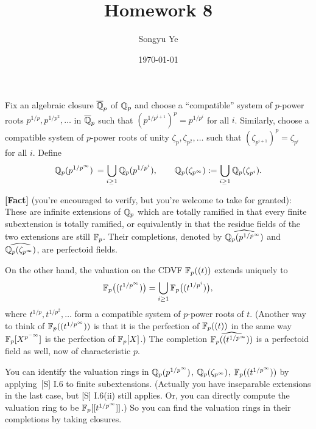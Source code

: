 \documentclass[12pt]{article}  %
\title{Homework 8}
\author{Songyu Ye}
\date{\today}
\begin{document}
\psettitle


Fix an algebraic closure $\overline{\mathbb{Q}}_p$ of $\mathbb{Q}_p$ and choose a ``compatible''
system of $p$-power roots $p^{1/p},p^{1/p^2},\ldots$ in $\overline{\mathbb{Q}}_p$
such that $(p^{1/p^{i+1}})^p=p^{1/p^i}$ for all $i$.
Similarly, choose a compatible system of $p$-power roots of unity
$\zeta_p,\zeta_{p^2},\ldots$ such that $(\zeta_{p^{i+1}})^p=\zeta_{p^i}$ for all $i$.
Define
\[
  \mathbb{Q}_p(p^{1/p^\infty})\:= \bigcup_{i\ge1}\mathbb{Q}_p(p^{1/p^i}),
  \qquad
  \mathbb{Q}_p(\zeta_{p^\infty}):= \bigcup_{i\ge1}\mathbb{Q}_p(\zeta_{p^i}).
\]

\noindent\textbf{[Fact]} (you’re encouraged to verify, but you’re welcome to take for granted):
These are infinite extensions of $\mathbb{Q}_p$ which are totally ramified
in that every finite subextension is totally ramified, or equivalently
in that the residue fields of the two extensions are still $\mathbb{F}_p$.
Their completions, denoted by $\widehat{\mathbb{Q}_p(p^{1/p^\infty})}$ and
$\widehat{\mathbb{Q}_p(\zeta_{p^\infty})}$, are perfectoid fields.

\medskip

On the other hand, the valuation on the CDVF $\mathbb{F}_p((t))$ extends uniquely to
\[
  \mathbb{F}_p\bigl((t^{1/p^\infty})\bigr)=\bigcup_{i\ge1}\mathbb{F}_p\bigl((t^{1/p^i})\bigr),
\]
where $t^{1/p},t^{1/p^2},\ldots$ form a compatible system of $p$-power roots of $t$.
(Another way to think of $\mathbb{F}_p((t^{1/p^\infty}))$ is that it is the perfection of
$\mathbb{F}_p((t))$ in the same way $\mathbb{F}_p[X^{p^{-\infty}}]$ is the perfection of $\mathbb{F}_p[X]$.)
The completion $\widehat{\mathbb{F}_p((t^{1/p^\infty}))}$ is a perfectoid field as well,
now of characteristic $p$.

You can identify the valuation rings in $\mathbb{Q}_p(p^{1/p^\infty})$,
$\mathbb{Q}_p(\zeta_{p^\infty})$, $\mathbb{F}_p((t^{1/p^\infty}))$ by applying \,[S] I.6 to finite
subextensions. (Actually you have inseparable extensions in the last case, but
[S] I.6(ii) still applies. Or, you can directly compute the valuation ring to be
$\mathbb{F}_p [[t^{1/p^\infty}]]$.) So you can find the valuation rings in
their completions by taking closures.
\end{document}
